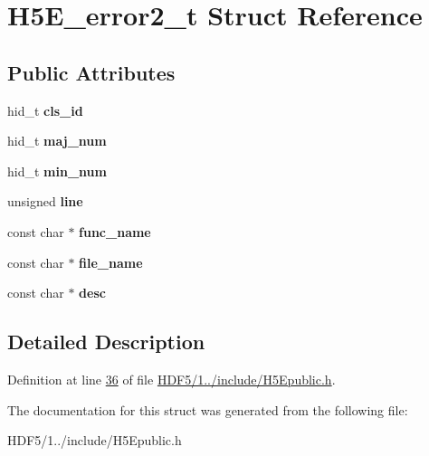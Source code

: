 \hypertarget{struct_h5_e__error2__t}{}\section{H5\+E\+\_\+error2\+\_\+t Struct Reference}
\label{struct_h5_e__error2__t}
\subsection*{Public Attributes}
\begin{DoxyCompactItemize}
\item 
\mbox{\label{struct_h5_e__error2__t_aa068c3ecd5b69d82bf35f7561be1bd43}} 
hid\+\_\+t {\bfseries cls\+\_\+id}
\item 
\mbox{\label{struct_h5_e__error2__t_aeac4963bd50b2eed6a885cbfbbfe62fb}} 
hid\+\_\+t {\bfseries maj\+\_\+num}
\item 
\mbox{\label{struct_h5_e__error2__t_a48879530c2babd9e19b867851845b74c}} 
hid\+\_\+t {\bfseries min\+\_\+num}
\item 
\mbox{\label{struct_h5_e__error2__t_a49a8526d9717b1adb1a4bdf2c1cb3bb2}} 
unsigned {\bfseries line}
\item 
\mbox{\label{struct_h5_e__error2__t_a745d4aa8e94b3b24c156a6110112452f}} 
const char $\ast$ {\bfseries func\+\_\+name}
\item 
\mbox{\label{struct_h5_e__error2__t_a37d312d4d1cd4a913fb637063867dd3e}} 
const char $\ast$ {\bfseries file\+\_\+name}
\item 
\mbox{\label{struct_h5_e__error2__t_aae8abf11d25bfa9a6414d01afef3a8f4}} 
const char $\ast$ {\bfseries desc}
\end{DoxyCompactItemize}


\subsection{Detailed Description}


Definition at line \hyperlink{_h_d_f5_21_810_81_2include_2_h5_epublic_8h_source_l00036}{36} of file \hyperlink{_h_d_f5_21_810_81_2include_2_h5_epublic_8h_source}{H\+D\+F5/1../include/\+H5\+Epublic.\+h}.



The documentation for this struct was generated from the following file\+:\begin{DoxyCompactItemize}
\item 
H\+D\+F5/1../include/\+H5\+Epublic.\+h\end{DoxyCompactItemize}
